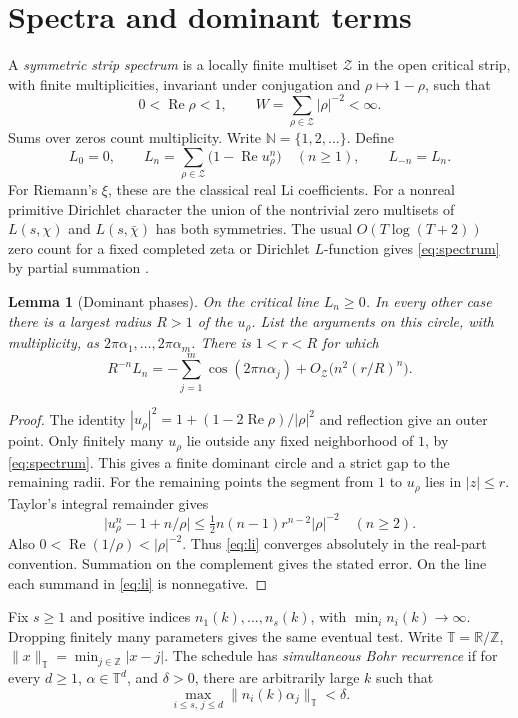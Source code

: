 \documentclass[11pt,letterpaper]{article}
\newtheorem{lemma}[theorem]{Lemma}
\newcommand{\T}{\mathbb T}
\newcommand{\Z}{\mathbb Z}
\newcommand{\N}{\mathbb N}
\newcommand{\R}{\mathbb R}
\newcommand{\Rea}{\operatorname{Re}}
\newcommand{\dist}[1]{\lVert #1\rVert_{\T}}
\newcommand{\smalltitle}[1]{\par\medskip\noindent{\color{ink}\textbf{#1}}\enspace}
\begin{document}
\section{Spectra and dominant terms}
A \emph{symmetric strip spectrum} is a locally finite multiset \(\mathcal Z\) in the open critical strip, with finite multiplicities, invariant under conjugation and \(\rho\mapsto1-\rho\), such that
\begin{equation}
 0<\Rea\rho<1,\qquad W=\sum_{\rho\in\mathcal Z} |\rho|^{-2}<\infty .
 \label{eq:spectrum}
\end{equation}
Sums over zeros count multiplicity. Write \(\N=\{1,2,\ldots\}\). Define
\begin{equation}
 L_0=0,\qquad L_n=\sum_{\rho\in\mathcal Z}\bigl(1-\Rea u_\rho^n\bigr)\quad(n\ge1),
 \qquad L_{-n}=L_n . \label{eq:li}
\end{equation}
For Riemann's \(\xi\), these are the classical real Li coefficients. For a nonreal primitive Dirichlet character the union of the nontrivial zero multisets of \(L(s,\chi)\) and \(L(s,\bar\chi)\) has both symmetries. The usual \(O(T\log(T+2))\) zero count for a fixed completed zeta or Dirichlet \(L\)-function gives \eqref{eq:spectrum} by partial summation \cite{lag}.
\begin{lemma}[Dominant phases]\label{lem:dom}
On the critical line \(L_n\ge0\). In every other case there is a largest radius \(R>1\) of the \(u_\rho\). List the arguments on this circle, with multiplicity, as \(2\pi\alpha_1,\ldots,2\pi\alpha_m\). There is \(1<r<R\) for which
\[
 R^{-n}L_n=-\sum_{j=1}^m\cos(2\pi n\alpha_j)
         +O_{\mathcal Z}\bigl(n^2(r/R)^n\bigr).
\]
\end{lemma}
\begin{proof}
The identity \(|u_\rho|^2=1+(1-2\Rea\rho)/|\rho|^2\) and reflection give an outer point. Only finitely many \(u_\rho\) lie outside any fixed neighborhood of \(1\), by \eqref{eq:spectrum}. This gives a finite dominant circle and a strict gap to the remaining radii. For the remaining points the segment from \(1\) to \(u_\rho\) lies in \(|z|\le r\). Taylor's integral remainder gives
\[
 \bigl|u_\rho^n-1+n/\rho\bigr|\le \tfrac12 n(n-1)r^{n-2}|\rho|^{-2}\quad(n\ge2).
\]
Also \(0<\Rea(1/\rho)<|\rho|^{-2}\). Thus \eqref{eq:li} converges absolutely in the real-part convention. Summation on the complement gives the stated error. On the line each summand in \eqref{eq:li} is nonnegative.
\end{proof}
\smalltitle{Schedules.}
Fix \(s\ge1\) and positive indices \(n_1(k),\ldots,n_s(k)\), with \(\min_i n_i(k)\to\infty\). Dropping finitely many parameters gives the same eventual test. Write \(\T=\R/\Z\), \(\dist{x}=\min_{j\in\Z}|x-j|\). The schedule has \emph{simultaneous Bohr recurrence} if for every \(d\ge1\), \(\alpha\in\T^d\), and \(\delta>0\), there are arbitrarily large \(k\) such that
\begin{equation}
 \max_{i\le s,\,j\le d}\dist{n_i(k)\alpha_j}<\delta . \label{eq:return}
\end{equation}
\end{document}
